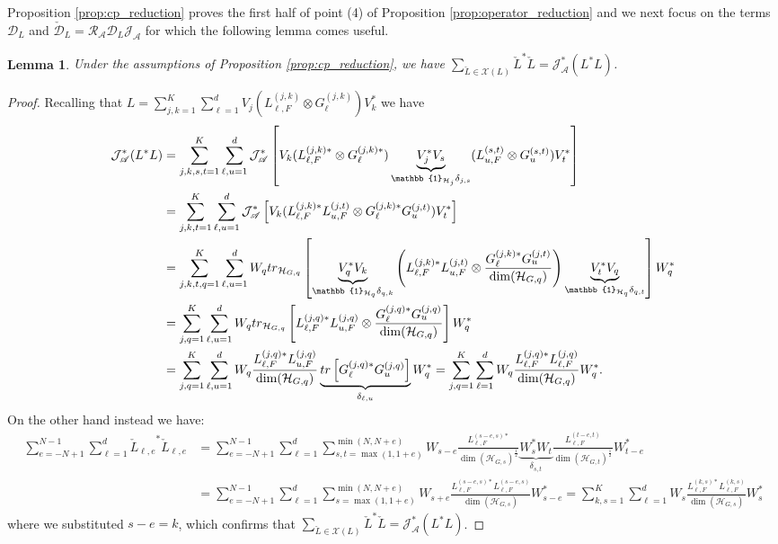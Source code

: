 \documentclass[aihp,12pt]{imsart}
\newcommand{\Dc}{\mathcal{D}}
\newcommand{\Hc}{\mathcal{H}}
\newcommand{\Jc}{\mathcal{J}}
\newcommand{\Rc}{\mathcal{R}}
\newcommand{\Xc}{\mathcal{X}}
\newcommand{\As}{\mathscr{A}}
\newcommand{\um}{\frac{1}{2}}
\newcommand{\one}{\mathbb{1}}
\newcommand{\tr}{{\rm tr}}
\theoremstyle{theorem}
\newtheorem{lemma}{Lemma}
\theoremstyle{definition}
\theoremstyle{remark}
\begin{document}
Proposition \ref{prop:cp_reduction} proves the first half of point (4) of Proposition \ref{prop:operator_reduction} and we next focus on the terms $\Dc_L$ and $\check{\Dc}_L = \Rc_\As\Dc_L\Jc_\As$ for which the following lemma comes useful.
\begin{lemma}
\label{lem:operator_reduction_dissipative}
    Under the assumptions of Proposition \ref{prop:cp_reduction}, we have $\sum_{\check{L}\in\Xc(L)}\check{L}^* \check{L} = \Jc_\As^*(L^* L)$.
\end{lemma}
\begin{proof}
Recalling that $L =\sum_{j,k=1}^K\sum_{\ell=1}^d V_j (L_{\ell,F}^{(j,k)}\otimes G_{\ell}^{(j,k)}) V_k^*$  we have 
\begin{align*}
    \Jc_\As^*(L^* L) &=\sum_{j,k,s,t=1}^K\sum_{\ell,u=1}^d \Jc_\As^* \left[V_k (L_{\ell,F}^{(j,k)*}\otimes G_{\ell}^{(j,k)*}) \underbrace{V_j^* V_s}_{\one_{\Hc_j}\delta_{j,s}} (L_{u,F}^{(s,t)}\otimes G_{u}^{(s,t)}) V_t^*\right] \\
    &=\sum_{j,k,t=1}^K\sum_{\ell,u=1}^d \Jc_\As^*\left[V_k (L_{\ell,F}^{(j,k)*}L_{u,F}^{(j,t)}\otimes G_{\ell}^{(j,k)*}G_{u}^{(j,t)}) V_t^*\right] \\
    &=\sum_{j,k,t, q=1}^K\sum_{\ell,u=1}^d W_q \tr_{\Hc_{G,q}} \left[\underbrace{V_q^* V_k}_{\one_{\Hc_q}\delta_{q,k}} \left(L_{\ell,F}^{(j,k)*}L_{u,F}^{(j,t)}\otimes \frac{G_{\ell}^{(j,k)*}G_{u}^{(j,t)}}{ \dim(\Hc_{G,q})  }\right) \underbrace{V_t^* V_q}_{\one_{\Hc_q}\delta_{q,t}}\right] W_q^* \\
    &=\sum_{j,q=1}^K\sum_{\ell,u=1}^d W_q \tr_{\Hc_{G,q}} \left[L_{\ell,F}^{(j,q)*}L_{u,F}^{(j,q)}\otimes \frac{G_{\ell}^{(j,q)*}G_{u}^{(j,q)}}{\dim(\Hc_{G,q})} \right] W_q^* \\
    &=\sum_{j,q=1}^K\sum_{\ell,u=1}^d W_q  \frac{L_{\ell,F}^{(j,q)*}L_{u,F}^{(j,q)}}{\dim(\Hc_{G,q})}\underbrace{\tr\left[ G_{\ell}^{(j,q)*}G_{u}^{(j,q)} \right]}_{\delta_{\ell,u}} W_q^* 
    =\sum_{j,q=1}^K\sum_{\ell=1}^d W_q  \frac{L_{\ell,F}^{(j,q)*}L_{\ell,F}^{(j,q)}}{\dim(\Hc_{G,q})} W_q^*.
\end{align*}
On the other hand instead we have:
\begin{align*}
    \sum_{e=-N+1}^{N-1}\sum_{\ell=1}^d {\check{L}_{\ell,e}}^* \check{L}_{\ell,e} 
    &=\sum_{e=-N+1}^{N-1} \sum_{\ell=1}^d \sum_{s,t=\max(1,1+e)}^{\min(N,N+e)} W_{s-e} \frac{L_{\ell,F}^{(s-e,s)*}}{\dim(\Hc_{G,s})^\um} \underbrace{W_s^* W_t}_{\delta_{s,t}} \frac{L_{\ell,F}^{(t-e,t)}}{\dim(\Hc_{G,t})^\um} W_{t-e}^* \\
    &=\sum_{e=-N+1}^{N-1} \sum_{\ell=1}^d \sum_{s=\max(1,1+e)}^{\min(N,N+e)} W_{s+e} \frac{L_{\ell,F}^{(s-e,s)*}L_{\ell,F}^{(s-e,s)}}{\dim(\Hc_{G,s})} W_{s-e}^* 
    = \sum_{k,s=1}^K \sum_{\ell=1}^d W_s \frac{L_{\ell,F}^{(k,s)*} L_{\ell,F}^{(k,s)} }{\dim(\Hc_{G,s})} W_s^* 
\end{align*}
where we substituted $s-e=k$, 
which confirms that $\sum_{\check{L}\in\Xc(L)}\check{L}^* \check{L} = \Jc_\As^*(L^* L)$. 
\end{proof}
\end{document}
